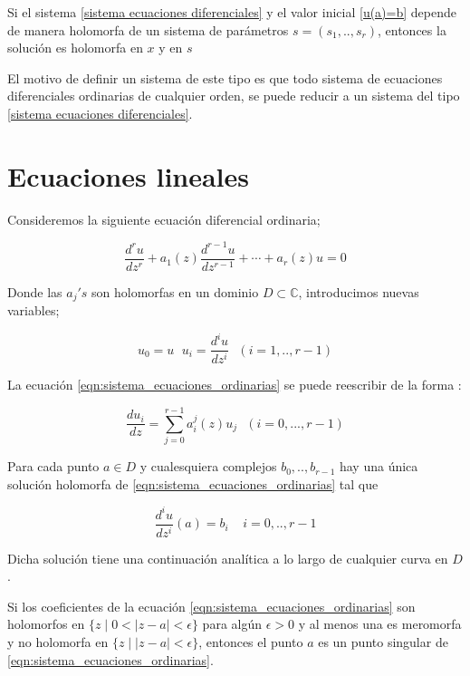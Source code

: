 \begin{thm} Si el sistema \ref{sistema ecuaciones diferenciales} y el valor inicial \ref{u(a)=b} depende de manera holomorfa de un sistema de par\'ametros $s=(s_{1},..,s_{r})$, entonces la soluci\'on es holomorfa en $x$ y en $s$
\end{thm}

El motivo de definir un sistema de este tipo es que todo sistema de ecuaciones diferenciales ordinarias de cualquier orden, se puede reducir a un sistema del tipo \ref{sistema ecuaciones diferenciales}.


\section{Ecuaciones lineales }

Consideremos la siguiente ecuaci\'on diferencial ordinaria;

\begin{equation}
\label{eqn:sistema_ecuaciones_ordinarias}
\frac{d^{r}u}{dz^{r}} + a_{1}(z) \frac{d^{r-1}u}{dz^{r-1}} + \cdots + a_{r}(z)u=0
\end{equation}

Donde las $a_{j}'s$ son holomorfas en un dominio $D \subset \mathbb{C}$, introducimos nuevas variables;

$$u_{0}=u \ \ \, u_{i} = \frac{d^{i}u}{dz^{i}} \ \ \ (i=1,..,r-1)$$

La ecuaci\'on \ref{eqn:sistema_ecuaciones_ordinarias} se puede reescribir de la forma :

\begin{equation}
\frac{du_{i}}{dz} = \sum_{j=0}^{r-1} a_{i}^{j}(z)u_{j} \ \ \ (i=0,...,r-1)
\end{equation}


\begin{thm}Para cada punto $a \in D$ y cualesquiera complejos $b_{0},..,b_{r-1}$ hay una \'unica soluci\'on holomorfa de \ref{eqn:sistema_ecuaciones_ordinarias} tal que

$$\frac{d^{i}u}{dz^{i}}(a) = b_{i} \ \ \ \ \ i=0,..,r-1$$

Dicha soluci\'on tiene una continuaci\'on anal\'itica a lo largo de cualquier curva en $D$.
\end{thm}

Si los coeficientes de la ecuaci\'on \ref{eqn:sistema_ecuaciones_ordinarias} son holomorfos en $\lbrace z \mid 0 < |z-a|< \epsilon  \rbrace $ para alg\'un $\epsilon > 0 $ y al menos una es meromorfa y no holomorfa en $\lbrace z \mid |z-a| < \epsilon \rbrace$, entonces el punto $a$ es un punto singular de \ref{eqn:sistema_ecuaciones_ordinarias}. \\

